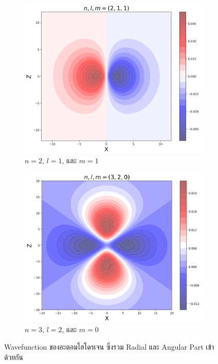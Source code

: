 \begin{figure}[H]
    \\
    \vspace{1em}
    \begin{subfigure}{0.5\textwidth}
        \centering
        \includegraphics[width=0.9\linewidth]{fig/wfn_hydro_n2_l1_m1.png}
        \caption{$n = 2$, $l = 1$, และ $m = 1$}
        \label{fig:wfn_hydro_n2_l1_m1}
    \end{subfigure}%
    \begin{subfigure}{0.5\textwidth}
        \centering
        \includegraphics[width=0.9\linewidth]{fig/wfn_hydro_n3_l2_m0.png}
        \caption{$n = 3$, $l = 2$, และ $m = 0$}
        \label{fig:wfn_hydro_n3_l2_m0}
    \end{subfigure}
    \caption{Wavefunction ของอะตอมไฮโดรเจน ซึ่งรวม Radial และ Angular Part เข้าด้วยกัน}
    \label{fig:wfn_hydro_all}
\end{figure}

